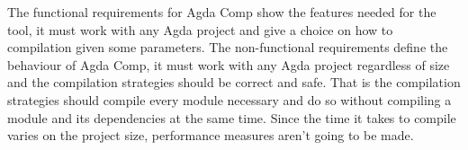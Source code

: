 The functional requirements for Agda Comp show the features needed for the
tool, it must work with any Agda project and give a choice on how to
compilation given some parameters. The non-functional requirements define the
behaviour of Agda Comp, it must work with any Agda project regardless of size
and the compilation strategies should be correct and safe. That is the
compilation strategies should compile every module necessary and do so without
compiling a module and its dependencies at the same time. Since the time it takes
to compile varies on the project size, performance measures aren't going to be
made.


%

